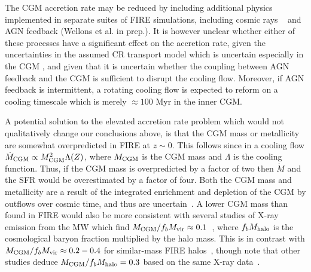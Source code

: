 \documentclass[fleqn,usenatbib]{mnras}
\newcommand{\Mdot}{\dot{M}}
\begin{document}
The CGM accretion rate may be reduced by including additional physics implemented in separate suites of FIRE simulations, including cosmic rays ~\citep{Chan2019, Hopkins2020a, Hopkins2020b, Hopkins2020c} and AGN feedback (Wellons et al. in prep.).
It is however unclear whether either of these processes have a significant effect on the accretion rate, given the uncertainties in the assumed CR transport model which is uncertain especially in the CGM \citep{Hopkins2021, Quataert2021a,Quataert2021b}, and given that it is uncertain whether the coupling between AGN feedback and the CGM is sufficient to disrupt the cooling flow.
Moreover, if AGN feedback is intermittent, a rotating cooling flow is expected to reform on a cooling timescale which is merely $\approx100$ Myr in the inner CGM. 

A potential solution to the elevated accretion rate problem which would not qualitatively change our conclusions above, is that the CGM mass or metallicity are somewhat overpredicted in FIRE at $z\sim0$.
This follows since in a cooling flow $\Mdot_{\rm CGM}\propto M_{\rm CGM}^2 \Lambda(Z)$, where $M_{\rm CGM}$ is the CGM mass and $\Lambda$ is the cooling function.
Thus, if the CGM mass is overpredicted by a factor of two then $\Mdot$ and the SFR would be overestimated by a factor of four.
Both the CGM mass and metallicity are a result of the integrated enrichment and depletion of the CGM by outflows over cosmic time, and thus are uncertain~\citep[e.g.,][]{Davies2020b, Kelly2021}.
A lower CGM mass than found in FIRE would also be more consistent with several studies of X-ray emission from the MW which find $M_{\rm CGM}/f_bM_{\rm vir} \approx 0.1$~\citep[][]{Li2018, Bregman2018}, where $f_b M_{\rm halo}$ is the cosmological baryon fraction multiplied by the halo mass. %
This is in contrast with $M_{\rm CGM}/f_bM_{\rm vir} \approx 0.2-0.4$ for similar-mass FIRE halos~\citep{Hafen2019}, though note that other studies deduce $M_{\rm CGM}/f_bM_{\rm halo}=0.3$ based on the same X-ray data~\citep{Faerman2019}.
\end{document}
